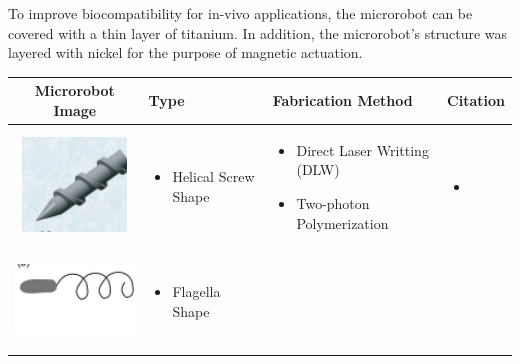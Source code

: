 \documentclass[12pt,a4paper,titlepage]{report}
\begin{document}
To improve biocompatibility for in-vivo applications, the 
microrobot can be covered with a thin layer of titanium. In addition, the microrobot\rq{}s structure was layered with 
nickel for the purpose of magnetic actuation.


\begin{table}[h!]
  \centering

\setlength{\arrayrulewidth}{.6mm}
\setlength{\tabcolsep}{5pt}
\renewcommand{\arraystretch}{.8}


  \begin{tabular}{ c  m{3cm}  m{4.3cm} m{3cm} }
    \hline
\rowcolor{lightgray}
    Microrobot Image & Type  & Fabrication Method & Citation \\ \hline\hline
    \begin{minipage}{.3\textwidth}
      \includegraphics[width=\linewidth, height=25mm]{screw_ta}
    \end{minipage}
    &
      \begin{itemize}
        \item Helical Screw Shape
    
      \end{itemize}
    & 
      \begin{itemize}
        \item Direct Laser Writting (DLW)
	\item Two-photon Polymerization
   
      \end{itemize}
	&
	   \begin{itemize}
        \item \citep{peyer2013magnetic}
   
      \end{itemize}
    \\ \hline

 \begin{minipage}{.3\textwidth}
      \includegraphics[width=\linewidth, height=25mm]{flagella_ta}
    \end{minipage}
    &
      \begin{itemize}
        \item Flagella Shape
      

\end{itemize}
\end{tabular}
\end{table}
\end{document}
